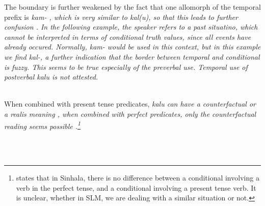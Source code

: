 The boundary is further weakened by the fact that one allomorph of the  temporal prefix  is \em kam- \em{}, which is very similar to \em kal(u)\em, so that this leads to further confusion \citep{Slomanson2008ismil}. In the following example, the speaker refers to a past situatino, which cannot be interpreted in terms of conditional truth values, since all events have already occured. Normally, \em kam- \em would be used in this context, but in this example we find \em kal-\em, a further indication that the border between temporal and conditional is fuzzy. This seems to be true especially of the preverbal use. Temporal use of postverbal \em kalu \em is not attested.


\\

When combined with present tense predicates, \em kalu \em can have a counterfactual   or a realis \kuckn  meaning , when combined with perfect predicates, only the counterfactual reading seems possible .\footnote{\citet[46]{Jayawardena2004} states that in Sinhala, there is no difference between a conditional involving a verb in the perfect tense, and a conditional involving a present tense verb. It is unclear, whether in SLM, we are dealing with a similar situation or not.}

 \\

 \\

